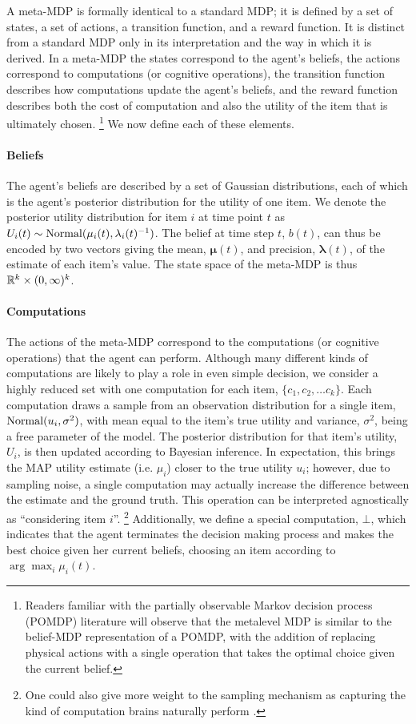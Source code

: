 \documentclass[12pt,a4paperpaper,]{article}
\begin{document}
A meta-MDP is formally identical to a standard MDP; it is defined by a set of states, a set of actions, a transition function, and a reward function. It is distinct from a standard MDP only in its interpretation and the way in which it is derived. In a meta-MDP the states correspond to the agent's beliefs, the actions correspond to computations (or cognitive operations), the transition function describes how computations update the agent's beliefs, and the reward function describes both the cost of computation and also the utility of the item that is ultimately chosen.%
  \footnote{Readers familiar with the partially observable Markov decision process (POMDP) literature will observe that the metalevel MDP is similar to the belief-MDP representation of a POMDP, with the addition of replacing physical actions with a single operation that takes the optimal choice given the current belief.}
We now define each of these elements.


\paragraph{Beliefs}
The agent's beliefs are described by a set of Gaussian distributions, each of which is the agent's posterior distribution for the utility of one item. We denote the posterior utility distribution for item $i$ at time point $t$ as $U_i(t) \sim \mathrm{Normal}(\mu_i(t), \lambda_i(t)^{-1})$. The belief at time step $t$, $b(t)$, can thus be encoded by two vectors giving the mean, $\boldsymbol{\mu}(t)$, and precision, $\boldsymbol{\lambda}(t)$, of the estimate of each item's value. The state space of the meta-MDP is thus $\mathbb{R}^k \times (0,\infty)^k$.

\paragraph{Computations}
The actions of the meta-MDP correspond to the computations (or cognitive operations) that the agent can perform. Although many different kinds of computations are likely to play a role in even simple decision, we consider a highly reduced set with one computation for each item, $\{c_1, c_2, \dots c_k \}$. Each computation draws a sample from an observation distribution for a single item, $\mathrm{Normal}(u_i, \sigma^2)$, with mean equal to the item's true utility and variance, $\sigma^2$, being a free parameter of the model. The posterior distribution for that item's utility, $U_i$, is then updated according to Bayesian inference. In expectation, this brings the MAP utility estimate (i.e. $\mu_i$) closer to the true utility $u_i$; however, due to sampling noise, a single computation may actually increase the difference between the estimate and the ground truth. This operation can be interpreted agnostically as ``considering item $i$''.%
  \footnote{One could also give more weight to the sampling mechanism as capturing the kind of computation brains naturally perform \citep{sanborn16}.}
Additionally, we define a special computation, $\bot$, which indicates that the agent terminates the decision making process and makes the best choice given her current beliefs, choosing an item according to $\arg\max_i \mu_i(t)$.
\end{document}
